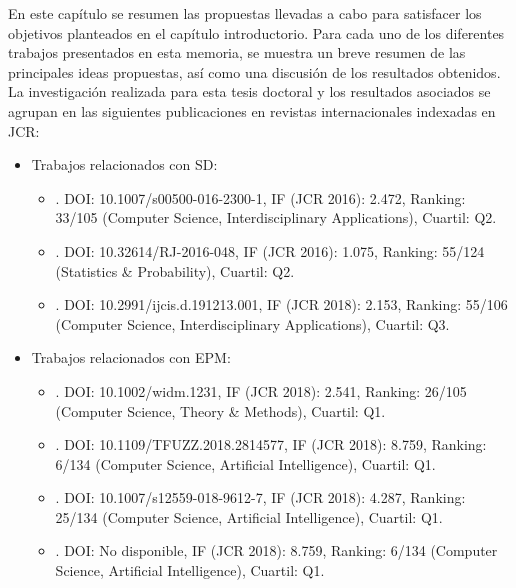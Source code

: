 \documentclass[c5paper,10pt,twoside]{book}	   	%
\begin{document}
En este capítulo se resumen las propuestas llevadas a cabo para satisfacer los objetivos planteados en el capítulo introductorio. Para cada uno de los diferentes trabajos presentados en esta memoria, se muestra un breve resumen de las principales ideas propuestas, así como una discusión de los resultados obtenidos. La investigación realizada para esta tesis doctoral y los resultados asociados se agrupan en las siguientes publicaciones en revistas internacionales indexadas en \ac{JCR}:
\begin{itemize}
	\item Trabajos relacionados con \ac{SD}:
	
	\begin{itemize}
		\item {}. DOI: 10.1007/s00500-016-2300-1, IF (JCR 2016): 2.472, Ranking: 33/105 (Computer Science, Interdisciplinary Applications), Cuartil: Q2.
		
		\item {}. DOI: 10.32614/RJ-2016-048, IF (JCR 2016): 1.075, Ranking: 55/124 (Statistics \& Probability), Cuartil: Q2.
		
		\item {}. DOI: 10.2991/ijcis.d.191213.001, IF (JCR 2018): 2.153, Ranking: 55/106 (Computer Science, Interdisciplinary Applications), Cuartil: Q3.
		
	\end{itemize}
	
	\item Trabajos relacionados con \ac{EPM}:
	
	\begin{itemize}
	\item {}. DOI: 10.1002/widm.1231, IF (JCR 2018): 2.541, Ranking: 26/105 (Computer Science, Theory \& Methods), Cuartil: Q1.
	
	\item \sloppy {}. DOI: 10.1109/TFUZZ.2018.2814577, IF (JCR 2018): 8.759, Ranking: 6/134 (Computer Science, Artificial Intelligence), Cuartil: Q1.
	


	\item {}. DOI: 10.1007/s12559-018-9612-7, IF (JCR 2018): 4.287, Ranking: 25/134 (Computer Science, Artificial Intelligence), Cuartil: Q1.
	


	\item {}. DOI: No disponible, IF (JCR 2018): 8.759, Ranking: 6/134 (Computer Science, Artificial Intelligence), Cuartil: Q1.
	\end{itemize}
	
\end{itemize}
\end{document}
